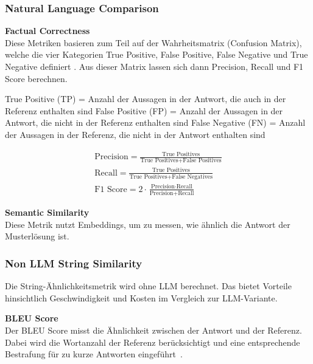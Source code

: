 \subsubsection{Natural Language Comparison}

\textbf{Factual Correctness}\\
Diese Metriken basieren zum Teil auf der Wahrheitsmatrix (Confusion Matrix), welche die vier Kategorien True Positive, False Positive, False Negative und True Negative definiert \cite{wikipedia_confusion_matrix}.
Aus dieser Matrix lassen sich dann Precision, Recall und F1 Score berechnen.

True Positive (TP) = Anzahl der Aussagen in der Antwort, die auch in der Referenz enthalten sind
False Positive (FP) = Anzahl der Aussagen in der Antwort, die nicht in der Referenz enthalten sind
False Negative (FN) = Anzahl der Aussagen in der Referenz, die nicht in der Antwort enthalten sind


\begin{gather*}
    \label{eq:precision}
    \text{Precision} = \frac{\text{True Positives}}{\text{True Positives} + \text{False Positives}} \\
    \label{eq:recall}
    \text{Recall} = \frac{\text{True Positives}}{\text{True Positives} + \text{False Negatives}} \\
    \label{eq:f1_score}
    \text{F1 Score} = 2 \cdot \frac{\text{Precision} \cdot \text{Recall}}{\text{Precision} + \text{Recall}}
\end{gather*}
\cite{wikipedia_confusion_matrix} %


\textbf{Semantic Similarity}\\
Diese Metrik nutzt Embeddings, um zu messen, wie ähnlich die Antwort der Musterlösung ist.

\subsubsection{Non LLM String Similarity}
Die String-Ähnlichkeitsmetrik wird ohne LLM berechnet.
Das bietet Vorteile hinsichtlich Geschwindigkeit und Kosten im Vergleich zur LLM-Variante.

\textbf{BLEU Score}\\
Der BLEU Score misst die Ähnlichkeit zwischen der Antwort und der Referenz.
Dabei wird die Wortanzahl der Referenz berücksichtigt und eine entsprechende Bestrafung für zu kurze Antworten eingeführt~\cite{ragas_traditional_metrics}.

